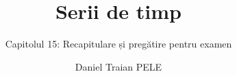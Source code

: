 \title[Serii de timp]{Serii de timp}
\subtitle{Capitolul 15: Recapitulare și pregătire pentru examen}
\author[D.T. Pele]{Daniel Traian PELE}
\date{}

\providecommand{\tsaapplink}[3]{\hypertarget{#2}{}\hyperlink{#1}{\beamergotobutton{#3}}}  %
\providecommand{\tsaappback}[2]{\begin{tikzpicture}[remember picture,overlay]\node[anchor=south east] at ([xshift=-3mm,yshift=7mm]current page.south east){\hyperlink{#1}{\beamerreturnbutton{#2}}};\end{tikzpicture}}  %
\providecommand{\tsachlink}[2]{\href{#1}{#2}}  %
\providecommand{\tsachlinkt}[2]{\href{#1}{\usebeamercolor[fg]{frametitle}#2}}  %


